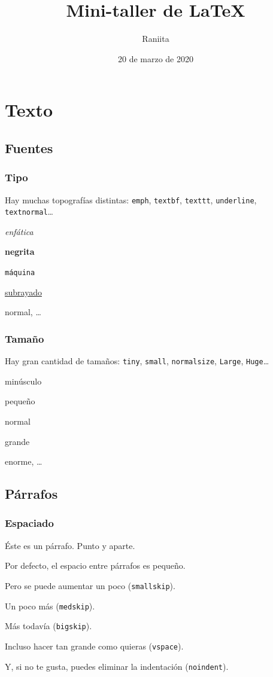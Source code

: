 \documentclass[12pt]{article}
\begin{document}
	\title{Mini-taller de \LaTeX}
	\author{Raniita}
	\date{20 de marzo de 2020}
	\maketitle
	\pagebreak
	\section{Texto}
	\subsection{Fuentes}
	\subsubsection{Tipo}
	Hay muchas topografías distintas: \texttt{emph}, \texttt{textbf}, \texttt{texttt}, \texttt{underline}, \texttt{textnormal}\ldots
	\par
	\emph{enfática}
	\par 
	\textbf{negrita}
	\par 
	\texttt{máquina}
	\par
	\underline{subrayado} 
	\par
	\textnormal{normal}, \ldots
	\subsubsection{Tamaño}
	Hay gran cantidad de tamaños: \texttt{tiny}, \texttt{small}, \texttt{normalsize}, \texttt{Large}, \texttt{Huge}\ldots
	\par
	{\tiny minúsculo}
	\par 
	{\small pequeño}
	\par
	{\normalsize normal}
	\par 
	{\Large grande}
	\par 
	{\Huge enorme}, \ldots
	\subsection{Párrafos}
	\subsubsection{Espaciado}
	Éste es un párrafo. Punto y aparte. 
	\par
	Por defecto, el espacio entre párrafos es pequeño.
	\par\smallskip
	Pero se puede aumentar un poco (\texttt{smallskip}).
	\par\medskip
	Un poco más (\texttt{medskip}).
	\par\bigskip
	Más todavía (\texttt{bigskip}).
	\par\vspace{2cm}
	Incluso hacer tan grande como quieras (\texttt{vspace}).
	\par\bigskip\noindent
	Y, si no te gusta, puedes eliminar la indentación (\texttt{noindent}).
\end{document}
